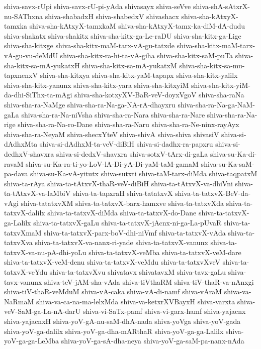 {shiva-savx-rUpi
shiva-savx-rU-pi-yAda
shivasayx
shiva-seVve
shiva-shA-sAtxrX-nu-SAThxna
shiva-shabadxH
shiva-shabedxV
shivashacx
shiva-sha-kAtxyX-tamxka
shiva-sha-kAtxyX-tamxkaM
shiva-sha-kAtxyX-tamx-ka-diM-dA-dudu
shiva-shakatx
shiva-shakitx
shiva-sha-kitx-ga-Le-raDU
shiva-sha-kitx-ga-Lige
shiva-sha-kitxge
shiva-sha-kitx-maM-tarx-vA-gu-tatxde
shiva-sha-kitx-maM-tarx-vA-gu-vu-deMdU
shiva-sha-kitx-ra-hi-ta-vA-giha
shiva-sha-kitx-saM-puTa
shiva-sha-kitx-sa-mA-yukatxH
shiva-sha-kitx-sa-mA-yukatxM
shiva-sha-kitx-sa-mu-tapxnenxV
shiva-sha-kitxya
shiva-sha-kitx-yaM-tapapx
shiva-sha-kitx-yalilx
shiva-sha-kitx-yanunx
shiva-sha-kitx-yara
shiva-sha-kitxyiM
shiva-sha-kitx-yiM-da-dhi-SiThx-ta-mAgi
shiva-sha-kotxyXV-BaR-veV-doyxVgoV
shiva-sha-raNa
shiva-sha-ra-NaMge
shiva-sha-ra-Na-ga-NA-rA-dhayxru
shiva-sha-ra-Na-ga-NaM-gaLa
shiva-sha-ra-Na-niVsha
shiva-sha-ra-Nara
shiva-sha-ra-Nare
shiva-sha-ra-Na-rige
shiva-sha-ra-Na-ro-Dane
shiva-sha-ra-Naru
shiva-sha-ra-Ne-ninx-rayAyx
shiva-sha-ra-NeyaM
shiva-shecxYteV
shiva-shivA
shiva-shiva
shivasiV
shiva-si-dAdhxMta
shiva-si-dAdhxM-ta-veV-diBiH
shiva-si-dadhx-ra-papxru
shiva-si-dedhxV-shavxra
shiva-si-dedxV-shavxra
shiva-sotxV-tArx-di-gaLa
shiva-su-Ka-di-ravaM
shiva-su-Ka-ra-ti-yo-LoV-lA-Di-yA-Di-yaM-taM-gamaM
shiva-su-Ka-saM-pa-dava
shiva-su-Ka-vA-yitutx
shiva-sutxti
shiva-taM-tarx-diMda
shiva-taqpatxM
shiva-ta-rAya
shiva-ta-tAtxvX-thaR-veV-diBiH
shiva-ta-tAtxvX-va-dhiVni
shiva-ta-tAtxvX-va-laMbiV
shiva-ta-tapxraH
shiva-tatatxvX
shiva-ta-tatxvX-BeV-da-vAgi
shiva-tatatxvXM
shiva-ta-tatxvX-barx-hamxve
shiva-ta-tatxvXda
shiva-ta-tatxvX-dalilx
shiva-ta-tatxvX-diMda
shiva-ta-tatxvX-do-Dane
shiva-ta-tatxvX-ga-Lalilx
shiva-ta-tatxvX-gaLu
shiva-ta-tatxvX-jAcnx-ni-ga-La-pUvaR
shiva-ta-tatxvXmaM
shiva-ta-tatxvX-parx-boV-dhi-niVmf
shiva-ta-tatxvX-vAda
shiva-ta-tatxvXva
shiva-ta-tatxvX-va-nanx-ri-yade
shiva-ta-tatxvX-vanunx
shiva-ta-tatxvX-va-nu-pA-dhi-yoLu
shiva-ta-tatxvX-veMba
shiva-ta-tatxvX-veM-dare
shiva-ta-tatxvX-veM-denu
shiva-ta-tatxvX-veMdu
shiva-ta-tatxvXveV
shiva-ta-tatxvX-veYdu
shiva-ta-tatxvXvu
shivatavx
shivatavxM
shiva-tavx-gaLu
shiva-tavx-vanunx
shiva-teV-jAM-sha-vAda
shiva-tiVthaRM
shiva-tiV-thaR-va-nAnxgi
shiva-tiV-thaR-veMduM
shiva-vA-caka
shiva-vA-di-namf
shiva-vAraM
shiva-va-NaRmaM
shiva-va-ca-na-ma-lelxMda
shiva-va-ketxrXVBayxH
shiva-varxta
shiva-veV-SaM-ga-La-nA-darU
shiva-vi-SaTx-pamf
shiva-vi-garx-hamf
shiva-yajacnx
shiva-yajacnxH
shiva-yoV-gA-nu-saM-dhA-nada
shiva-yoVga
shiva-yoV-gada
shiva-yoV-ga-dalilx
shiva-yoV-ga-dha-mARthaR
shiva-yoV-ga-ga-Lalilx
shiva-yoV-ga-ga-LeMba
shiva-yoV-ga-sA-dha-neya
shiva-yoV-ga-saM-pa-nanx-nAda
}

